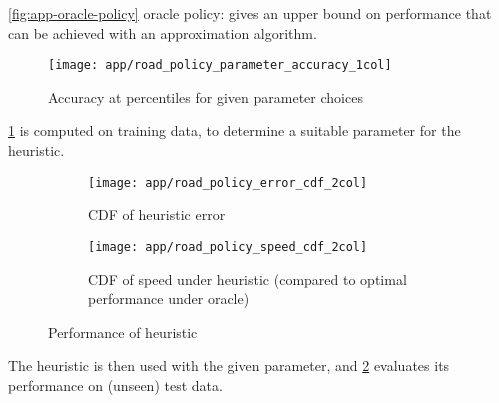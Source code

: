 \cref{fig:app-oracle-policy} oracle policy: gives an upper bound on performance that can be achieved with an approximation algorithm.

\begin{figure}
    \centering
    \texttt{[image: app/road\_policy\_parameter\_accuracy\_1col]}
    \caption{Accuracy at percentiles for given parameter choices}
    \label{fig:app-policy-parameter-accuracy}
\end{figure}

\cref{fig:app-policy-parameter-accuracy} is computed on training data, to determine a suitable parameter for the heuristic.

\begin{figure}
    \begin{widepage}
    \begin{subfigure}[c]{0.5\textwidth}
      \texttt{[image: app/road\_policy\_error\_cdf\_2col]}
      \caption{CDF of heuristic error}
    \end{subfigure}
    \begin{subfigure}[c]{0.5\textwidth}
      \texttt{[image: app/road\_policy\_speed\_cdf\_2col]}
      \caption{CDF of speed under heuristic (compared to optimal performance under oracle)}
    \end{subfigure}
    \end{widepage}
    \caption{Performance of heuristic}
    \label{fig:app-cdf}
\end{figure}

The heuristic is then used with the given parameter, and \cref{fig:app-cdf} evaluates its performance on (unseen) test data.

%
%
%
%
%

